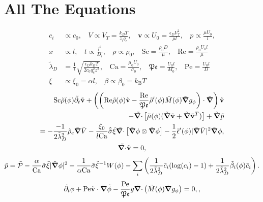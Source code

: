 \documentclass[a4paper,10pt]{article}
\renewcommand{\v}[1]{\mathbf{#1}}
\renewcommand{\v}[1]{\ensuremath{\mathbf{#1}}} %
\newcommand{\ti}[1]{\ensuremath{\tilde{#1}}} %
\newcommand{\gv}[1]{\ensuremath{\mbox{\boldmath$ #1 $}}}
\newcommand{\grad}[1]{\gv{\nabla} #1} %
\renewcommand{\div}[1]{\gv{\nabla} \cdot #1} %
\newcommand{\pdt}[1]{\partial_t #1}
\begin{document}
\section{All The Equations}
\begin{align}
c_i &\propto c_0, ~~~~ V \propto V_T = \frac{k_B T}{z_i q_e}, ~~~~\v{v} \propto U_0 = \frac{\epsilon_D V_T^2}{\mu l}, ~~~~p \propto \frac{\mu U_0}{l},\\
x &\propto l , ~~~~ t \propto \frac{l^2}{D_i}, ~~~~ \rho \propto \rho_0, ~~~~ \mathrm{Sc} = \frac{\rho_0 D}{\mu}, ~~~~\mathrm{Re} = \frac{\rho_0 U_0 l}{\mu} \\
\tilde{\lambda}_D &= \frac{1}{l}\sqrt{\frac{\epsilon_D k_B T}{2 c_0 q_e^2 z^2}}, ~~~~ \mathrm{Ca} = \frac{\mu_0 U_0}{\sigma_0}, ~~~~\mathfrak{Pe} = \frac{U_0 l}{M_0}, ~~~~ \mathrm{Pe} = \frac{U_0 l}{D }\\
\xi &\propto \xi_0 = \alpha l, ~~~~ \beta \propto \beta_0 = k_{\mathrm{B}} T   
\end{align}
\begin{gather}
\begin{split}	
\mathrm{Sc} \ti{\rho}(\phi) \ti{\pdt{}} \ti{\v{v}}
+ \left( \left( \mathrm{Re} \ti\rho(\phi) \ti{\v{v}} - \frac{\mathrm{Re} }{\mathfrak{Pe}}\ti\rho'(\phi) \ti M(\phi) \ti{\grad{}}  g_\phi  \right) \cdot \ti{\grad{}} \right) \ti{\v{v}}\\
- \ti{\div{}} \left[\ti \mu(\phi)(\ti{\grad{}} \ti{\v{v}} + \ti{\grad{}} \ti{\v{v}} ^T) \right] + \ti{\grad{}} \ti{p} \\
= - \frac{-1}{2\tilde{\lambda}_D^2} \ti \rho_e \ti{\grad{}} \ti{V} - \frac{ \xi_0 }{l\mathrm{Ca}}\hat{\ti{\sigma}} \ti \xi\ti{\div{}} \left[ \ti{\grad{}} \phi \otimes \ti{\grad{}} \phi \right] - \frac 1 2 \ti \epsilon'(\phi) | \ti{\grad{}} \ti V |^2 \ti{\grad{}} \phi,
\end{split}\\
\ti{\div{}} \ti{\v{v}} = 0, 
\end{gather}
\begin{equation}
\ti{p} = \ti{\mathcal{P}} -   \frac{\alpha}{ \mathrm{Ca}} \ti{\sigma}\ti{\xi}|\ti{\grad{}} \phi|^2 - \frac{ 1}{\alpha \mathrm{Ca}}\ti{\sigma}\ti{\xi}^{-1} W(\phi)  - \sum_i \left( \frac{ 1}{2\ti{\lambda}_D^2} \ti{c}_i(\log(c_i) -1) + \frac{1}{2\ti{\lambda}_D^2}\ti{\beta}_i(\phi) \ti{c}_i \right) .
\end{equation}
\begin{gather}
\ti{\pdt{}} \phi + \mathrm{Pe}\ti{\v v} \cdot \ti{\grad{}}\ti{\phi} - \frac{\mathrm{Pe} }{\mathfrak{Pe}} g\ti{\div{}} \left(\ti{M}(\phi) \ti{\grad{}} g_\phi \right) = 0,,
\end{gather}
\end{document}

